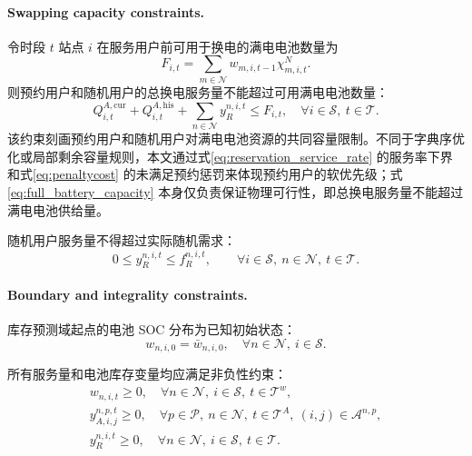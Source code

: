 \documentclass[12pt,hyperref,a4paper,UTF8]{ctexart}
\begin{document}
\paragraph{Swapping capacity constraints.}
令时段 $t$ 站点 $i$ 在服务用户前可用于换电的满电电池数量为
\begin{equation}
F_{i,t}=\sum_{m\in\mathcal{N}}w_{m,i,t-1}\chi_{m,i,t}^{N}.
\label{eq:available_full_batteries}
\end{equation}
则预约用户和随机用户的总换电服务量不能超过可用满电电池数量：
\begin{equation}
Q_{i,t}^{A,\mathrm{cur}}+Q_{i,t}^{A,\mathrm{his}}+
\sum_{n\in\mathcal{N}}y_R^{n,i,t}
\le F_{i,t},
\quad \forall i\in\mathcal{S},\ t\in\mathcal{T}.
\label{eq:full_battery_capacity}
\end{equation}
该约束刻画预约用户和随机用户对满电电池资源的共同容量限制。不同于字典序优化或局部剩余容量规则，本文通过式\eqref{eq:reservation_service_rate} 的服务率下界和式\eqref{eq:penaltycost} 的未满足预约惩罚来体现预约用户的软优先级；式\eqref{eq:full_battery_capacity} 本身仅负责保证物理可行性，即总换电服务量不能超过满电电池供给量。

随机用户服务量不得超过实际随机需求：
\begin{equation}
0\le y_R^{n,i,t}\le f_R^{n,i,t},
\qquad
\forall i\in \mathcal{S},\ n\in \mathcal{N},\ t\in \mathcal{T}.
\label{eq:random_bound}
\end{equation}

\paragraph{Boundary and integrality constraints.}
库存预测域起点的电池 SOC 分布为已知初始状态：
\begin{equation}
w_{n,i,0}=\bar{w}_{n,i,0},
\quad \forall n\in \mathcal{N},\ i\in \mathcal{S}.
\label{eq:initial_inventory}
\end{equation}

所有服务量和电池库存变量均应满足非负性约束：
\begin{gather}
w_{n,i,t}\ge 0,
\quad \forall n\in \mathcal{N},\ i\in \mathcal{S},\ t\in \mathcal{T}^{w},
\label{eq:nonnegative_w}\\
y_{A,i,j}^{n,p,t}\ge 0,
\quad \forall p\in \mathcal{P},\ n\in \mathcal{N},\ t\in \mathcal{T}^{A},\ (i,j)\in \mathcal{A}^{n,p},
\label{eq:nonnegative_a}\\
y_R^{n,i,t}\ge 0,
\quad \forall n\in \mathcal{N},\ i\in \mathcal{S},\ t\in \mathcal{T}.
\label{eq:nonnegative_r}
\end{gather}
\end{document}

